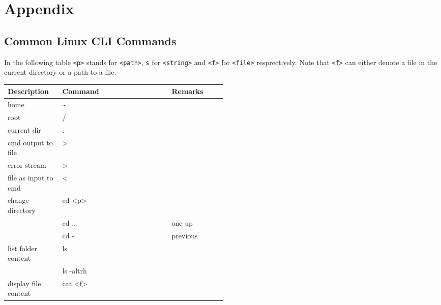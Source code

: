 \section{Appendix}
\subsection{Common Linux CLI Commands}
In the following table \texttt{<p>} stands for \texttt{<path>}, \texttt{s} for \texttt{<string>} and \texttt{<f>} for \texttt{<file>} resprectively. Note that \texttt{<f>} can either denote a file in the current directory or a path to a file.\\
\renewcommand{\arraystretch}{1.1}
\setlength\tabcolsep{3pt} %
{\small %
    \begin{tabularx}{\linewidth}{@{} p{0.25\linewidth}>{\ttfamily}lp{0.25\linewidth} @{}}
        \toprule
        Description          & \normalfont Command        & Remarks                          \\
        \midrule
        home                 & \textasciitilde{}          &                                  \\
        root                 & /                          &                                  \\
        current dir          & .                          &                                  \\
        cmd output to file   & >                          &                                  \\
        error stream         & 2>                         &                                  \\
        file as input to cmd & <                          &                                  \\
        change directory     & cd <p>                     &                                  \\
                             & cd ..                      & one up                           \\
                             & cd -                       & previous                         \\
        list folder content  & ls                         &                                  \\
                             & ls -altrh                  &                                  \\
        display file content & cat <f>                    &                                  \\

\end{tabularx}}

